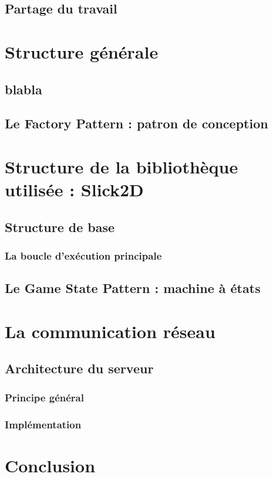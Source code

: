 \documentclass{report}
\begin{document}
\section{Partage du travail}

\chapter{Structure générale}
\section{blabla}
\section{Le Factory Pattern : patron de conception}


\chapter{Structure de la bibliothèque utilisée : Slick2D}
\section{Structure de base}
\subsection{La boucle d'exécution principale}
\section{Le Game State Pattern : machine à états}


\chapter{La communication réseau}
\section{Architecture du serveur}
\subsection{Principe général}
\subsection{Implémentation}

\chapter{Conclusion}
\end{document}
